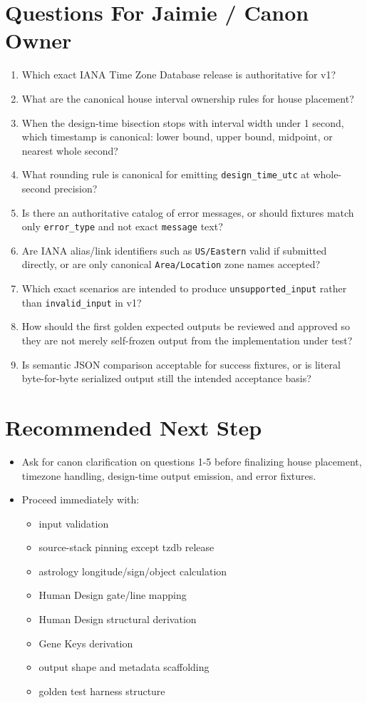 \documentclass[11pt]{article}
\begin{document}
\section{Questions For Jaimie / Canon Owner}
\label{sec:orgcbab2fd}
\begin{enumerate}
\item Which exact IANA Time Zone Database release is authoritative for v1?
\item What are the canonical house interval ownership rules for house placement?
\item When the design-time bisection stops with interval width under 1 second, which timestamp is canonical: lower bound, upper bound, midpoint, or nearest whole second?
\item What rounding rule is canonical for emitting \texttt{design\_time\_utc} at whole-second precision?
\item Is there an authoritative catalog of error messages, or should fixtures match only \texttt{error\_type} and not exact \texttt{message} text?
\item Are IANA alias/link identifiers such as \texttt{US/Eastern} valid if submitted directly, or are only canonical \texttt{Area/Location} zone names accepted?
\item Which exact scenarios are intended to produce \texttt{unsupported\_input} rather than \texttt{invalid\_input} in v1?
\item How should the first golden expected outputs be reviewed and approved so they are not merely self-frozen output from the implementation under test?
\item Is semantic JSON comparison acceptable for success fixtures, or is literal byte-for-byte serialized output still the intended acceptance basis?
\end{enumerate}
\section{Recommended Next Step}
\label{sec:orgd7602ae}
\begin{itemize}
\item Ask for canon clarification on questions 1-5 before finalizing house placement, timezone handling, design-time output emission, and error fixtures.
\item Proceed immediately with:
\begin{itemize}
\item input validation
\item source-stack pinning except tzdb release
\item astrology longitude/sign/object calculation
\item Human Design gate/line mapping
\item Human Design structural derivation
\item Gene Keys derivation
\item output shape and metadata scaffolding
\item golden test harness structure
\end{itemize}
\end{itemize}
\end{document}
